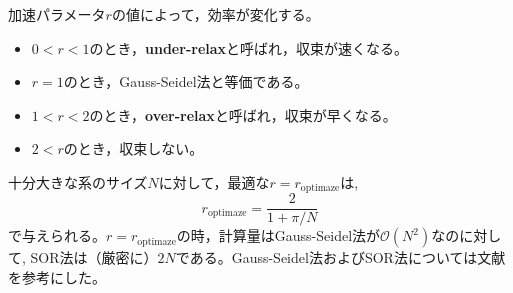 \documentclass[autodetect-engine,dvi=dvipdfmx,a4paper,ja=standard,oneside,openany,11pt,draft]{bxjsbook}
\begin{document}
加速パラメータ$r$の値によって，効率が変化する。
\begin{itemize}
  \item $0<r<1$のとき，\textbf{under-relax}と呼ばれ，収束が速くなる。
  \item $r=1$のとき，Gauss-Seidel法と等価である。
  \item $1<r<2$のとき，\textbf{over-relax}と呼ばれ，収束が早くなる。
  \item $2<r$のとき，収束しない。
\end{itemize}
十分大きな系のサイズ$N$に対して，最適な$r=r_{\mathrm{optimaze}}$は,
\begin{equation}
  r_{\mathrm{optimaze}}=\frac{2}{1+\pi/N}
  \label{eq:optimaze_r}
\end{equation}
で与えられる。$r=r_{\mathrm{optimaze}}$の時，計算量はGauss-Seidel法が$\mathcal{O}(N^2)$なのに対して, SOR法は（厳密に）$2N$である。Gauss-Seidel法およびSOR法については文献\cite{hinch2020numerical}を参考にした。

\ifdraft{
  
  
}{}
\end{document}
